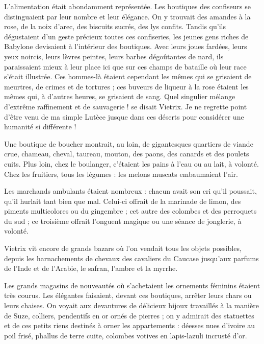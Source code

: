 \documentclass[a4paper, 11pt, oneside, polutonikogreek, french]{article}
\begin{document}
L'alimentation était abondamment représentée. Les boutiques des confiseurs se distinguaient par leur nombre et leur élégance. On y trouvait des amandes à la rose, de la noix d'arec, des biscuits sucrés, des lys confits. Tandis qu'ils dégustaient d'un geste précieux toutes ces confiseries, les jeunes gens riches de Babylone devisaient à l'intérieur des boutiques. Avec leurs joues fardées, leurs yeux noircis, leurs lèvres peintes, leurs barbes dégoûtantes de nard, ils paraissaient mieux à leur place ici que sur ces champs de bataille où leur race s'était illustrée. Ces hommes-là étaient cependant les mêmes qui se grisaient de meurtres, de crimes et de tortures ; ces buveurs de liqueur à la rose étaient les mêmes qui, à d'autres heures, se grisaient de sang. Quel singulier mélange d'extrême raffinement et de sauvagerie ! se disait Vietrix. Je ne regrette point d'être venu de ma simple Lutèce jusque dans ces déserts pour considérer une humanité si différente !

Une boutique de boucher montrait, au loin, de gigantesques quartiers de viande crue, chameau, cheval, taureau, mouton, des paons, des canards et des poulets cuits. Plus loin, chez le boulanger, c'étaient les pains à l'eau ou au lait, à volonté. Chez les fruitiers, tous les légumes : les melons muscats embaumaient l'air.

Les marchands ambulants étaient nombreux : chacun avait son cri qu'il poussait, qu'il hurlait tant bien que mal. Celui-ci offrait de la marinade de limon, des piments multicolores ou du gingembre ; cet autre des colombes et des perroquets du sud ; ce troisième offrait l'onguent magique ou une séance de jonglerie, à volonté.

Vietrix vit encore de grands bazars où l'on vendait tous les objets possibles, depuis les harnachements de chevaux des cavaliers du Caucase jusqu'aux parfums de l'Inde et de l'Arabie, le safran, l'ambre et la myrrhe.

Les grands magasins de nouveautés où s'achetaient les ornements féminins étaient très courus. Les élégantes faisaient, devant ces boutiques, arrêter leurs chars ou leurs chaises. On voyait aux devantures de délicieux bijoux travaillés à la manière de Suze, colliers, pendentifs en or ornés de pierres ; on y admirait des statuettes et de ces petits riens destinés à orner les appartements : déesses nues d'ivoire au poil frisé, phallus de terre cuite, colombes votives en lapis-lazuli incrusté d'or.

\bigskip
\centerline{\EightStarTaper}
\centerline{\EightStarTaper\EightStarTaper}
\bigskip
\end{document}
